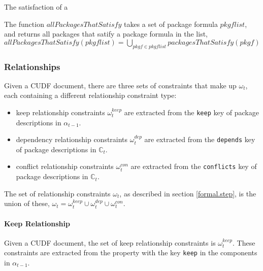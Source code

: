 The satisfaction of a 
\begin{defs}
The function $allPackagesThatSatisfy$ takes a set of package formula $pkgflist$, and returns all packages that satify a package formula in the list,
$allPackagesThatSatisfy(pkgflist) = \bigcup \limits_{pkgf \in pkgflist} packagesThatSatisfy(pkgf)$ 
\end{defs}

\subsubsection{Relationships}
Given a CUDF document, there are three sets of constraints that make up $\omega_t$, each containing a different relationship constraint type:
\begin{itemize}
  \item keep relationship constraints $\omega_t^{keep}$ are extracted from the \verb+keep+ key of package descriptions in $\alpha_{t-1}$.
  \item dependency relationship constraints $\omega_t^{dep}$ are extracted from the \verb+depends+ key of package descriptions in $\mathbb{C}_t$.
  \item conflict relationship constraints $\omega_t^{con}$ are extracted from the \verb+conflicts+ key of package descriptions in $\mathbb{C}_t$.
\end{itemize}
The set of relationship constraints $\omega_t$, as described in section \ref{formal.step}, is the union of these,
$\omega_t =  \omega_t^{keep} \cup \omega_t^{dep} \cup \omega_t^{con}$.


\paragraph{Keep Relationship}
Given a CUDF document, the set of keep relationship constraints is $\omega_t^{keep}$.
These constraints are extracted from the property with the key \texttt{keep} in the components in $\alpha_{t-1}$.
 
